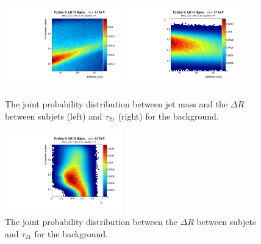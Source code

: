 \documentclass{article}
\begin{document}
\begin{figure}[htbp!]
  \begin{center}
        \includegraphics[width=0.45\textwidth]{figures/mass_dR_back.pdf} \includegraphics[width=0.45\textwidth]{figures/mass_tau21_back.pdf}
      \caption{ The joint probability distribution between jet mass and the $\Delta R$ between subjets (left) and $\tau_{21}$ (right) for the background.  
      \label{fig:mass_tau21} }
    \end{center}
\end{figure}

\begin{figure}[htbp!]
  \begin{center}
        \includegraphics[width=0.45\textwidth]{figures/tau21_dR_back.pdf}
      \caption{ The joint probability distribution between the $\Delta R$ between subjets and $\tau_{21}$ for the background.      \label{fig:dr_tau21} }
    \end{center}
\end{figure}


\clearpage
\newpage

 
\end{document}
